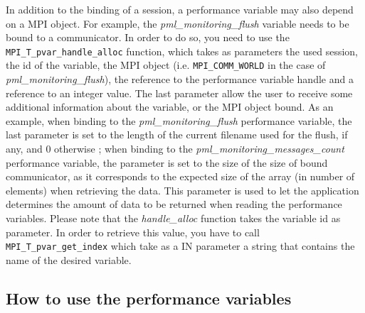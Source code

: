 \documentclass[notitlepage]{article}
\newcommand{\brkunds}[0]{\allowbreak\_}
\begin{document}
In addition to the binding of a session, a performance variable may
also depend on a MPI object. For example, the
\textit{pml\brkunds{}monitoring\brkunds{}flush} variable needs to be
bound to a communicator. In order to do so, you need to use the
\texttt{MPI\brkunds{}T\brkunds{}pvar\brkunds{}handle\brkunds{}alloc}
function, which takes as parameters the used session, the id of the
variable, the MPI object
(i.e. \texttt{MPI\brkunds{}COMM\brkunds{}WORLD} in the case of
\textit{pml\brkunds{}monitoring\brkunds{}flush}), the reference to the
performance variable handle and a reference to an integer value. The
last parameter allow the user to receive some additional information
about the variable, or the MPI object bound. As an example, when
binding to the \textit{pml\brkunds{}monitoring\brkunds{}flush}
performance variable, the last parameter is set to the length of the
current filename used for the flush, if any, and 0 otherwise ; when
binding to the
\textit{pml\brkunds{}monitoring\brkunds{}messages\brkunds{}count}
performance variable, the parameter is set to the size of the size of
bound communicator, as it corresponds to the expected size of the
array (in number of elements) when retrieving the data. This parameter
is used to let the application determines the amount of data to be
returned when reading the performance variables. Please note that the
\textit{handle\brkunds{}alloc} function takes the variable id as
parameter. In order to retrieve this value, you have to call
\texttt{MPI\brkunds{}T\brkunds{}pvar\brkunds{}get\brkunds{}index}
which take as a IN parameter a string that contains the name of the
desired variable.

\subsection{How to use the performance variables}
\end{document}
